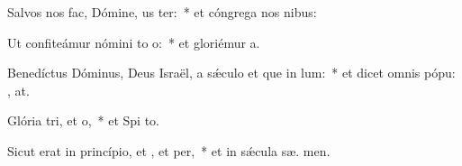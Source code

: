 \item Salvos nos fac, Dómine, us ter:~* et cóngrega nos  nibus:
\item Ut confiteámur nómini to o:~* et gloriémur   a.
\item Benedíctus Dóminus, Deus Israël, a sǽculo et que in lum:~* et dicet omnis pópu: , at.
\item Glória tri, et o,~* et Spi to.
\item Sicut erat in princípio, et , et per,~* et in sǽcula sæ. men.
